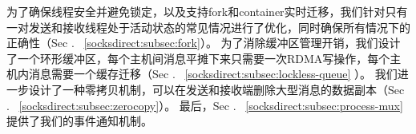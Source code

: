 为了确保线程安全并避免锁定，以及支持fork和container实时迁移，我们针对只有一对发送和接收线程处于活动状态的常见情况进行了优化，同时确保所有情况下的正确性（Sec .~ \ref {socksdirect:subsec:fork}）。
为了消除缓冲区管理开销，我们设计了一个环形缓冲区，每个主机间消息平摊下来只需要一次RDMA写操作，每个主机内消息需要一个缓存迁移（Sec .~ \ref {socksdirect:subsec:lockless-queue} ）。
我们进一步设计了一种零拷贝机制，可以在发送和接收端删除大型消息的数据副本（Sec .~ \ref {socksdirect:subsec:zerocopy}）。
最后，Sec .~ \ref {socksdirect:subsec:process-mux}提供了我们的事件通知机制。



